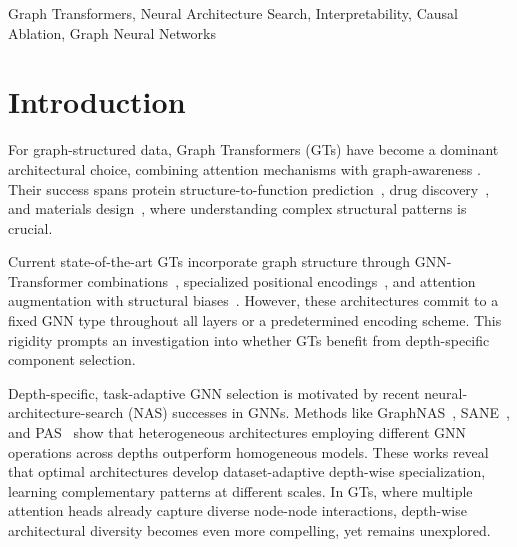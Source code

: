 \documentclass[lettersize,journal]{IEEEtran}
\begin{document}
\begin{IEEEkeywords}
Graph Transformers, Neural Architecture Search, Interpretability, Causal Ablation, Graph Neural Networks
\end{IEEEkeywords}


\section{Introduction}

For graph-structured data, Graph Transformers (GTs) have become a dominant architectural choice, combining attention mechanisms with graph-awareness \cite{lin_mesh_2021, chen_structure-aware_2022}. Their success spans protein structure-to-function prediction~\cite{gu_hierarchical_2023}, drug discovery~\cite{gao_graphormerdti_2024}, and materials design~\cite{yuan_survey_2025}, where understanding complex structural patterns is crucial.

Current state-of-the-art GTs incorporate graph structure through GNN-Transformer combinations~\cite{rampa_recipe_nodate,chen_structure-aware_2022}, specialized positional encodings~\cite{kreuzer_rethinking_2021}, and attention augmentation with structural biases~\cite{ying_transformers_2021}.  However, these architectures commit to a fixed GNN type throughout all layers or a predetermined encoding scheme. This rigidity prompts an investigation into whether GTs benefit from depth-specific component selection.

Depth-specific, task-adaptive GNN selection is motivated by recent neural-architecture-search (NAS) successes in GNNs. Methods like GraphNAS~\cite{gao_graphnas_2019}, SANE~\cite{zhao_search_2021}, and PAS~\cite{wei_neural_2024} show that heterogeneous architectures employing different GNN operations across depths outperform homogeneous models. These works reveal that optimal architectures develop dataset-adaptive depth-wise specialization, learning complementary patterns at different scales. In GTs, where multiple attention heads already capture diverse node-node interactions, depth-wise architectural diversity becomes even more compelling, yet remains unexplored.
\end{document}
